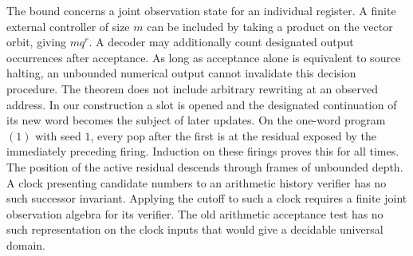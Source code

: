 The bound concerns a joint observation state for an individual register. A finite external controller of size \(m\) can be included by taking a product on the vector orbit, giving \(m q^r\). A decoder may additionally count designated output occurrences after acceptance. As long as acceptance alone is equivalent to source halting, an unbounded numerical output cannot invalidate this decision procedure. The theorem does not include arbitrary rewriting at an observed address. In our construction a slot is opened and the designated continuation of its new word becomes the subject of later updates. On the one-word program \((1)\) with seed \(1\), every pop after the first is at the residual exposed by the immediately preceding firing. Induction on these firings proves this for all times. The position of the active residual descends through frames of unbounded depth. A clock presenting candidate numbers to an arithmetic history verifier has no such successor invariant. Applying the cutoff to such a clock requires a finite joint observation algebra for its verifier. The old arithmetic acceptance test has no such representation on the clock inputs that would give a decidable universal domain.

